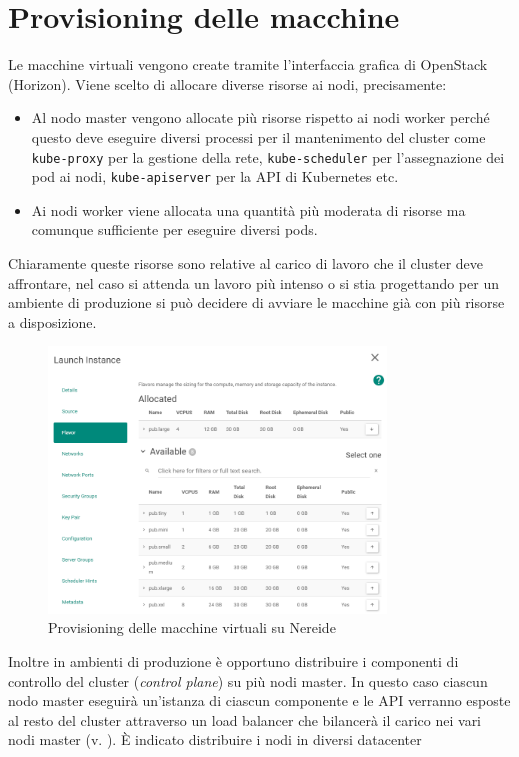 \documentclass[12pt,a4paper,openright,twoside]{book}
\begin{document}
\section{Provisioning delle macchine}
Le macchine virtuali vengono create tramite l'interfaccia grafica di OpenStack (Horizon). Viene scelto di allocare diverse risorse ai nodi, precisamente: 
\begin{itemize}
    \item Al nodo master vengono allocate più risorse rispetto ai nodi worker perché questo deve eseguire diversi processi per il mantenimento del cluster
        come \texttt{kube-proxy} per la gestione della rete, \texttt{kube-scheduler} per l'assegnazione dei pod ai nodi, \texttt{kube-apiserver} per la API di Kubernetes etc.
    \item Ai nodi worker viene allocata una quantità più moderata di risorse ma comunque sufficiente per eseguire diversi pods. 
\end{itemize}
Chiaramente queste risorse sono relative al carico di lavoro che il cluster deve affrontare, nel caso si attenda un lavoro più intenso o si stia progettando per un ambiente di produzione
si può decidere di avviare le macchine già con più risorse a disposizione.
\begin{figure}[!hbt]
    \centering
    \includegraphics[width=0.8\textwidth]{figures/vm-nereide.png}
    \caption{Provisioning delle macchine virtuali su Nereide}
    \label{fig:kube-vm-provisioning}
\end{figure}
\FloatBarrier
Inoltre in ambienti di produzione è opportuno distribuire i componenti di controllo del cluster (\textit{control plane}) su più nodi master. In questo caso ciascun nodo master eseguirà un'istanza
di ciascun componente e le API verranno esposte al resto del cluster attraverso un load balancer che bilancerà il carico nei vari nodi master (v. ). È indicato distribuire i nodi in diversi datacenter 
\end{document}
